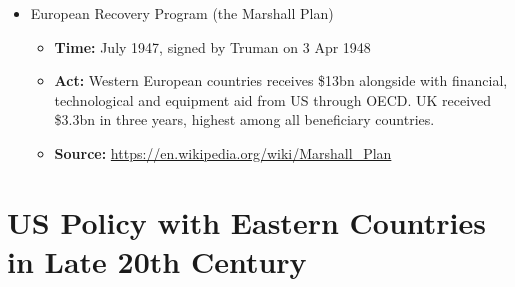 \begin{itemize}
		\item European Recovery Program (the Marshall Plan)
			\begin{itemize}
			\item \textbf{Time: }July 1947, signed by Truman on 3 Apr 1948
			\item \textbf{Act: } Western European countries receives \$13bn alongside with financial, technological and equipment aid from US through OECD. UK received \$3.3bn in three years, highest among all beneficiary countries.
			\item	\textbf{Source: }\url{https://en.wikipedia.org/wiki/Marshall_Plan}
			\end{itemize}
		\end{itemize}
		

\section{US Policy with Eastern Countries in Late 20th Century}
